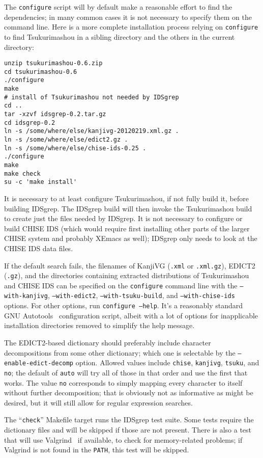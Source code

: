 \documentclass[twocolumn]{report}
\begin{document}
The \texttt{configure}
script will by default make a reasonable effort to find the dependencies; in
many common cases it is not necessary to specify them on the command line. 
Here is a more complete installation process relying on \texttt{configure}
to find Tsukurimashou in a
sibling directory and the others in the current directory:
\begin{verbatim}
unzip tsukurimashou-0.6.zip
cd tsukurimashou-0.6
./configure
make
# install of Tsukurimashou not needed by IDSgrep
cd ..
tar -xzvf idsgrep-0.2.tar.gz
cd idsgrep-0.2
ln -s /some/where/else/kanjivg-20120219.xml.gz .
ln -s /some/where/else/edict2.gz .
ln -s /some/where/else/chise-ids-0.25 .
./configure
make
make check
su -c 'make install'
\end{verbatim}

It is necessary to at least configure Tsukurimashou, if not fully build it,
before building IDSgrep.  The IDSgrep build will then invoke the
Tsukurimashou build to create just the files needed by IDSgrep.  It is not
necessary to configure or build CHISE IDS (which would require first
installing other parts of the larger CHISE system and probably XEmacs as
well); IDSgrep only needs to look at the CHISE IDS data files.

If the default search fails, the filenames of KanjiVG (\texttt{.xml} or
\texttt{.xml.gz}), EDICT2 (\texttt{.gz}), and the directories containing
extracted distributions of Tsukurimashou and CHISE IDS can be
specified on the \texttt{configure} command line with
the \texttt{--with-kanjivg}, \texttt{--with-edict2},
\texttt{--with-tsuku-build}, and \texttt{--with-chise-ids} options.  For
other options, run \texttt{configure --help}.  It's a reasonably standard
GNU Autotools~\cite{Autotools} configuration script, albeit with a lot of
options for inapplicable installation directories removed to simplify the
help message.

The EDICT2-based dictionary should preferably include
character decompositions from some other dictionary; which one is
selectable by the \texttt{--enable-edict-decomp} option.  Allowed values
include \texttt{chise}, \texttt{kanjivg}, \texttt{tsuku}, and \texttt{no};
the default of \texttt{auto} will try all of those in that order and use the
first that works.  The value \texttt{no} corresponds to simply mapping every
character to itself without further decomposition; that is obviously not as
informative as might be desired, but it will still allow for regular
expression searches.

The ``\texttt{check}'' Makefile target runs the IDSgrep test suite.  Some
tests require the dictionary files and will be skipped if those are not
present.  There is also a test that will use Valgrind~\cite{Valgrind} if
available, to check for memory-related problems; if Valgrind is not found in
the \texttt{PATH}, this test will be skipped.
\end{document}
